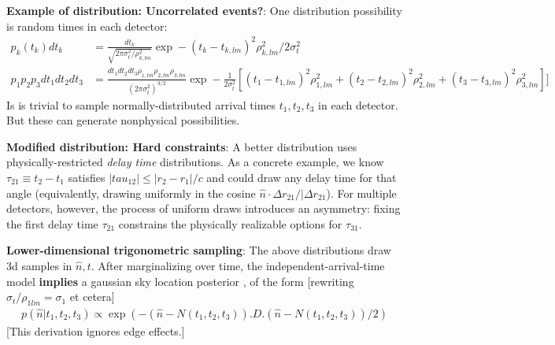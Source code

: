 \documentclass[twocolumn,prd,nofootinbib]{revtex4}
\begin{document}
\begin{widetext}
\begin{shaded}
\end{shaded}

\begin{shaded}
\noindent \textbf{Example of distribution: Uncorrelated events?}: One distribution possibility is random times in each detector:
\begin{align}
p_k(t_k) dt_k &= \frac{dt_k}{\sqrt{2\pi  \sigma_t^2/\rho_{k,lm}^2}} \exp - (t_k - t_{k,lm})^2 \rho_{k,lm}^2/2\sigma_t^2 \\
p_1 p_2 p_3 dt_1 dt_2 dt_3 &= \frac{dt_1 dt_2 dt_3 \rho_{1,lm}\rho_{2,lm}\rho_{3,lm}}{(2\pi \sigma_t^2)^{3/2}}
 \exp - \frac{1}{2\sigma_t^2}\left[ (t_1 - t_{1,lm})^2 \rho_{1,lm}^2 + (t_2 - t_{2,lm})^2 \rho_{2,lm}^2 + (t_3 -
   t_{3,lm})^2 \rho_{3,lm}^2 \right]]
\end{align}
Is is trivial to sample normally-distributed  arrival times $t_1,t_2,t_3$ in each detector.  But these can generate
nonphysical possibilities.

\noindent \textbf{Modified distribution: Hard constraints}: A better distribution uses physically-restricted \emph{delay
  time} distributions.  As a concrete example, we know  $\tau_{21}\equiv t_2-t_1$ satisfies $|tau_{12}| \le |r_2
-r_1|/c$ and could draw any delay time for that angle (equivalently, drawing uniformly in the cosine $\hat{n}\cdot
\Delta r_{21}/|\Delta r_{21}$).  For multiple detectors, however, the process of uniform draws introduces an asymmetry:
fixing the first delay time $\tau_{21}$ constrains the physically realizable options for $\tau_{31}$.
\end{shaded}


\noindent \textbf{Lower-dimensional trigonometric sampling}:  The above distributions draw 3d samples in $\hat{n},t$.
After marginalizing over time, the independent-arrival-time model \textbf{implies} a gaussian sky location posterior
\cite{2011CQGra..28j5021F}, of the form [rewriting $\sigma_t/\rho_{1lm} = \sigma_1$ et cetera]
\begin{eqnarray}
p(\hat{n}|t_1,t_2,t_3) \propto \exp(- (\hat{n}-N(t_1,t_2,t_3)).D.(\hat{n}-N(t_1,t_2,t_3))/2)
\end{eqnarray}
[This derivation ignores edge effects.]


\end{widetext}
\end{document}
